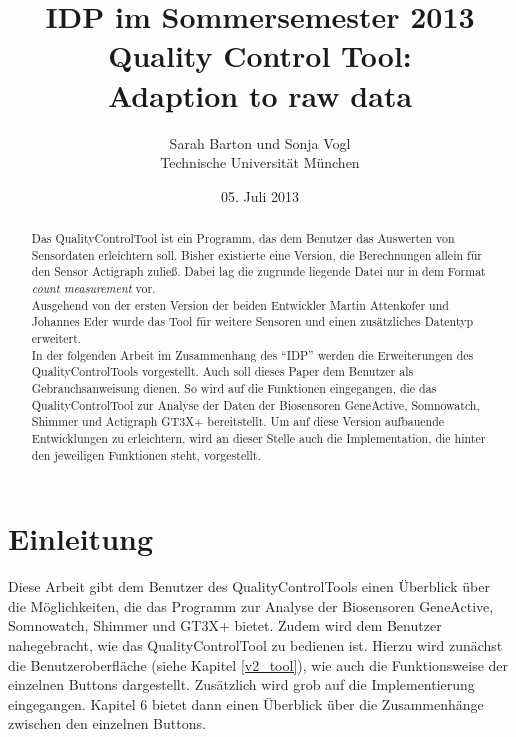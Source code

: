 \documentclass[onecolumn,german]{article}
\author{Sarah Barton und Sonja Vogl \\ Technische Universität München}
\title{IDP im Sommersemester 2013 \\
       {\bf Quality Control Tool:\\ Adaption to raw data}
}
\date{05. Juli 2013}
\begin{document}
\maketitle


\begin{center}
\begin{abstract}

\noindent

Das QualityControlTool ist ein Programm, das dem Benutzer das Auswerten von Sensordaten erleichtern soll. Bisher existierte eine Version, die Berechnungen allein für den Sensor Actigraph zuließ. Dabei lag die zugrunde liegende Datei nur in dem Format \textit{count measurement} vor.\\
Ausgehend von der ersten Version der beiden Entwickler Martin Attenkofer und Johannes Eder wurde das Tool für weitere Sensoren und einen zusätzliches Datentyp erweitert.\\
In der folgenden Arbeit im Zusammenhang des ``IDP'' werden die Erweiterungen des QualityControlTools vorgestellt. Auch soll dieses Paper dem Benutzer als Gebrauchsanweisung dienen. So wird auf die Funktionen eingegangen, die das QualityControlTool zur Analyse der Daten 
 der Biosensoren GeneActive, Somnowatch, Shimmer und Actigraph GT3X+ bereitstellt. Um auf diese Version aufbauende Entwicklungen zu erleichtern, wird an dieser Stelle auch die Implementation, die hinter den jeweiligen Funktionen steht, vorgestellt. 

\end{abstract}
\end{center}


\newpage

\tableofcontents

\newpage
\section{Einleitung}
\label{Einleitung}

Diese Arbeit gibt dem Benutzer des QualityControlTools einen Überblick über die Möglichkeiten, die das Programm zur Analyse der Biosensoren GeneActive, Somnowatch, Shimmer und GT3X+ bietet. Zudem wird dem Benutzer nahegebracht, wie das QualityControlTool zu bedienen ist. Hierzu wird zunächst die Benutzeroberfläche (siehe Kapitel \ref{v2_tool}), wie auch die Funktionsweise der einzelnen Buttons dargestellt. Zusätzlich wird grob auf die Implementierung eingegangen. Kapitel 6 bietet dann einen Überblick über die Zusammenhänge zwischen den einzelnen Buttons.
\end{document}
